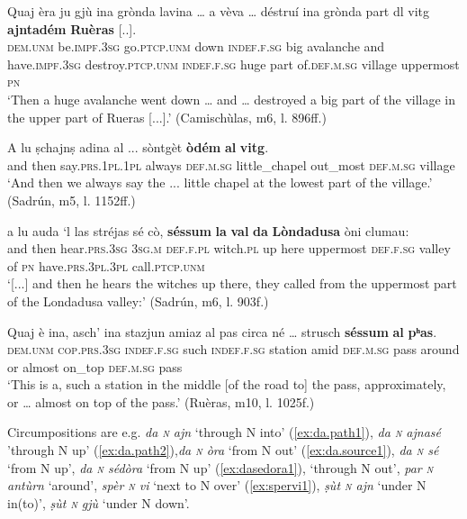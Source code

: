 \ea

\gll    Quaj èra ju gjù ina grònda lavina … a vèva … déstruí ina grònda part dl vitg \textbf{ajntadém} \textbf{Ruèras} [..].\\
\textsc{dem.unm} be.\textsc{impf.3sg} go.\textsc{ptcp.unm} down \textsc{indef.f.sg} big avalanche {} and have.\textsc{impf.3sg} {} destroy.\textsc{ptcp.unm} \textsc{indef.f.sg} huge part of.\textsc{def.m.sg} village uppermost \textsc{pn}\\
\glt `Then a huge avalanche went down … and  … destroyed a big part of the village in the upper part of Rueras [...].' (Camischùlas, m6, l. 896ff.)
\z

\ea

\gll A lu ṣchajnṣ adina al ... sòntgèt \textbf{òdém} \textbf{al} \textbf{vitg}.\\
and then say.\textsc{prs.1pl.1pl} always \textsc{def.m.sg} {} little\_chapel out\_most \textsc{def.m.sg} village\\
\glt `And then we always say the ... little chapel at the lowest part of the village.' (Sadrún, m5, l. 1152ff.)
\z

\ea

\gll    [...] a lu auda `l las stréjas sé cò, \textbf{séssum} \textbf{la} \textbf{val} \textbf{da} \textbf{Lòndadusa} òni clumau:\\
{} and then hear.\textsc{prs.3sg} \textsc{3sg.m} \textsc{def.f.pl} witch.\textsc{pl} up here uppermost \textsc{def.f.sg} valley of \textsc{pn} have.\textsc{prs.3pl.3pl} call.\textsc{ptcp.unm}\\
\glt `[...] and then he hears the witches up there, they called from the uppermost part of the Londadusa valley:' (Sadrún, m6, l. 903f.)
\z

\ea

\gll Quaj è ina, asch’ ina stazjun amiaz al pas circa né … strusch \textbf{séssum} \textbf{al} \textbf{pʰas}.   \\
\textsc{dem.unm} \textsc{cop.prs.3sg} \textsc{indef.f.sg} such \textsc{indef.f.sg} station amid \textsc{def.m.sg} pass around or {} almost on\_top \textsc{def.m.sg} pass\\
\glt `This is a, such a station in the middle [of the road to] the pass, approximately, or … almost on top of the pass.' (Ruèras, m10, l. 1025f.)
\z

Circumpositions are e.g. \textit{da \textsc{n} ajn} `through N into' (\ref{ex:da.path1}), \textit{da \textsc{n} ajnasé} 'through N up' (\ref{ex:da.path2}),\textit{da \textsc{n} òra} `from N out' (\ref{ex:da.source1}), \textit{da \textsc{n} sé} `from N up', \textit{da \textsc{n} sédòra} `from N up' (\ref{ex:dasedora1}),  `through N out', \textit{par \textsc{n} antùrn} `around', \textit{spèr \textsc{n} vi} `next to N over' (\ref{ex:spervi1}), \textit{ṣùt \textsc{n} ajn} `under N in(to)', \textit{ṣùt \textsc{n} gjù} `under N down'.

